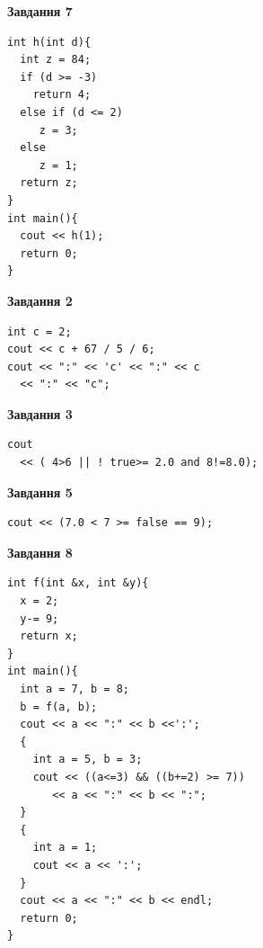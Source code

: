 \documentclass[12pt, ukrainian]{article}
\begin{document}
{\begin {large}
\begin{minipage}[t]{7.0cm}
\begin{center}
\textbf{Завдання 7}
\end{center}
\vspace{-8mm}

\begin{verbatim}
int h(int d){
  int z = 84;
  if (d >= -3)
    return 4;
  else if (d <= 2)
     z = 3;
  else
     z = 1;
  return z;
}
int main(){
  cout << h(1);
  return 0;
}
\end{verbatim}

\end{minipage}
\vline \hspace{1mm}
\begin{minipage}[t]{11.0cm}

\begin{center}
\textbf{Завдання 2}
\end{center}
\vspace{-8mm}

\begin{verbatim}
int c = 2;
cout << c + 67 / 5 / 6;
cout << ":" << 'c' << ":" << c 
  << ":" << "c";
\end{verbatim}



\begin{center}
\textbf{Завдання 3}
\end{center}
\vspace{-8mm}

\begin{verbatim}
cout 
  << ( 4>6 || ! true>= 2.0 and 8!=8.0);
\end{verbatim}



\begin{center}
\textbf{Завдання 5}
\end{center}
\vspace{-8mm}

\begin{verbatim}
cout << (7.0 < 7 >= false == 9);
\end{verbatim}



\begin{center}
\textbf{Завдання 8}
\end{center}
\vspace{-8mm}

\begin{verbatim}
int f(int &x, int &y){
  x = 2;
  y-= 9;
  return x;
}
int main(){
  int a = 7, b = 8;
  b = f(a, b);
  cout << a << ":" << b <<':';
  {
    int a = 5, b = 3;
    cout << ((a<=3) && ((b+=2) >= 7))
       << a << ":" << b << ":";
  }
  {
    int a = 1;
    cout << a << ':';
  }
  cout << a << ":" << b << endl;
  return 0;
}
\end{verbatim}


\end{minipage}
\end{large}}
\end{document}
